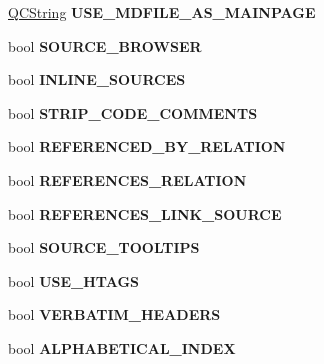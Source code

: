 \begin{DoxyCompactItemize}
\mbox{\hyperlink{class_q_c_string}{Q\+C\+String}} {\bfseries U\+S\+E\+\_\+\+M\+D\+F\+I\+L\+E\+\_\+\+A\+S\+\_\+\+M\+A\+I\+N\+P\+A\+GE}
\item 
\mbox{\label{class_config_values_acbed329f1a8166023d506a95526ead00}} 
bool {\bfseries S\+O\+U\+R\+C\+E\+\_\+\+B\+R\+O\+W\+S\+ER}
\item 
\mbox{\label{class_config_values_aca2dce8a80f218f6e62564b61f0eb1fe}} 
bool {\bfseries I\+N\+L\+I\+N\+E\+\_\+\+S\+O\+U\+R\+C\+ES}
\item 
\mbox{\label{class_config_values_a9a811d389d470d764ec8e2640b0d1746}} 
bool {\bfseries S\+T\+R\+I\+P\+\_\+\+C\+O\+D\+E\+\_\+\+C\+O\+M\+M\+E\+N\+TS}
\item 
\mbox{\label{class_config_values_adb38271019974ddd9430c3c1a7acc13e}} 
bool {\bfseries R\+E\+F\+E\+R\+E\+N\+C\+E\+D\+\_\+\+B\+Y\+\_\+\+R\+E\+L\+A\+T\+I\+ON}
\item 
\mbox{\label{class_config_values_aef6f05337bb9c86ba23148f8ed62b2db}} 
bool {\bfseries R\+E\+F\+E\+R\+E\+N\+C\+E\+S\+\_\+\+R\+E\+L\+A\+T\+I\+ON}
\item 
\mbox{\label{class_config_values_af6a166fdad4200a60aa1c87c767c1473}} 
bool {\bfseries R\+E\+F\+E\+R\+E\+N\+C\+E\+S\+\_\+\+L\+I\+N\+K\+\_\+\+S\+O\+U\+R\+CE}
\item 
\mbox{\label{class_config_values_a7942fa9426434d413f56e276f831ca13}} 
bool {\bfseries S\+O\+U\+R\+C\+E\+\_\+\+T\+O\+O\+L\+T\+I\+PS}
\item 
\mbox{\label{class_config_values_a0d4b2b419c381a440db6f09f14db9131}} 
bool {\bfseries U\+S\+E\+\_\+\+H\+T\+A\+GS}
\item 
\mbox{\label{class_config_values_aacab660ec0be54e21778fc58c8198d91}} 
bool {\bfseries V\+E\+R\+B\+A\+T\+I\+M\+\_\+\+H\+E\+A\+D\+E\+RS}
\item 
\mbox{\label{class_config_values_a2322a78c0fb72909437c6fb26aa2ebc3}} 
bool {\bfseries A\+L\+P\+H\+A\+B\+E\+T\+I\+C\+A\+L\+\_\+\+I\+N\+D\+EX}

\end{DoxyCompactItemize}
